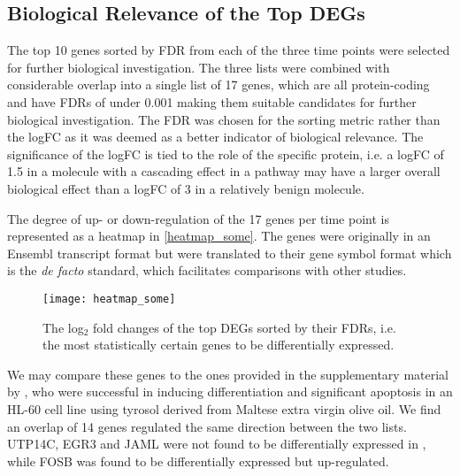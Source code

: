 \subsection{Biological Relevance of the Top DEGs}
The top 10 genes sorted by \ac{FDR} from each of the three time points were selected for further biological investigation. The three lists were combined with considerable overlap into a single list of 17 genes, which are all protein-coding and have \ac{FDR}s of under 0.001 making them suitable candidates for further biological investigation. The \ac{FDR} was chosen for the sorting metric rather than the \ac{logFC} as it was deemed as a better indicator of biological relevance. The significance of the \ac{logFC} is tied to the role of the specific protein, i.e. a \ac{logFC} of 1.5 in a molecule with a cascading effect in a pathway may have a larger overall biological effect than a \ac{logFC} of 3 in a relatively benign molecule. 

The degree of up- or down-regulation of the 17 genes per time point is represented as a heatmap in \autoref{heatmap_some}. The genes were originally in an Ensembl transcript format but were translated to their gene symbol format which is the \textit{de facto} standard, which facilitates comparisons with other studies.


\begin{figure}[!h]
    \centering
    \texttt{[image: heatmap\_some]}
    \caption{The log$_2$ fold changes of the top DEGs sorted by their FDRs, i.e. the most statistically certain genes to be differentially expressed. } 
    \label{fig:heatmap_some}
\end{figure}


We may compare these genes to the ones provided in the supplementary material by \cite{gatt2021tyrosol}, who were successful in inducing differentiation and significant apoptosis in an HL-60 cell line using tyrosol derived from Maltese extra virgin olive oil. We find an overlap of 14 genes regulated the same direction between the two lists. UTP14C, EGR3 and JAML were not found to be differentially expressed in \cite{gatt2021tyrosol}, while FOSB was found to be differentially expressed but up-regulated.

